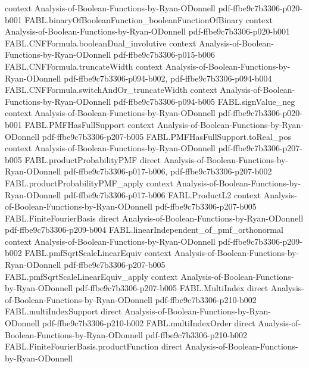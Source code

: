 \begin{theorem}
  {context}
  {Analysis-of-Boolean-Functions-by-Ryan-ODonnell}
  {pdf-ffbe9c7b3306-p020-b001}
\proofstep
  {FABL.binaryOfBooleanFunction_booleanFunctionOfBinary}
  {context}
  {Analysis-of-Boolean-Functions-by-Ryan-ODonnell}
  {pdf-ffbe9c7b3306-p020-b001}
\proofstep
  {FABL.CNFFormula.booleanDual_involutive}
  {context}
  {Analysis-of-Boolean-Functions-by-Ryan-ODonnell}
  {pdf-ffbe9c7b3306-p015-b006}
\proofstep
  {FABL.CNFFormula.truncateWidth}
  {context}
  {Analysis-of-Boolean-Functions-by-Ryan-ODonnell}
  {pdf-ffbe9c7b3306-p094-b002,
    pdf-ffbe9c7b3306-p094-b004}
\proofstep
  {FABL.CNFFormula.switchAndOr_truncateWidth}
  {context}
  {Analysis-of-Boolean-Functions-by-Ryan-ODonnell}
  {pdf-ffbe9c7b3306-p094-b005}
\proofstep
  {FABL.signValue_neg}
  {context}
  {Analysis-of-Boolean-Functions-by-Ryan-ODonnell}
  {pdf-ffbe9c7b3306-p020-b001}
\proofstep
  {FABL.PMFHasFullSupport}
  {context}
  {Analysis-of-Boolean-Functions-by-Ryan-ODonnell}
  {pdf-ffbe9c7b3306-p207-b005}
\proofstep
  {FABL.PMFHasFullSupport.toReal_pos}
  {context}
  {Analysis-of-Boolean-Functions-by-Ryan-ODonnell}
  {pdf-ffbe9c7b3306-p207-b005}
\proofstep
  {FABL.productProbabilityPMF}
  {direct}
  {Analysis-of-Boolean-Functions-by-Ryan-ODonnell}
  {pdf-ffbe9c7b3306-p017-b006,
    pdf-ffbe9c7b3306-p207-b002}
\proofstep
  {FABL.productProbabilityPMF_apply}
  {context}
  {Analysis-of-Boolean-Functions-by-Ryan-ODonnell}
  {pdf-ffbe9c7b3306-p017-b006}
\proofstep
  {FABL.ProductL2}
  {context}
  {Analysis-of-Boolean-Functions-by-Ryan-ODonnell}
  {pdf-ffbe9c7b3306-p207-b005}
\proofstep
  {FABL.FiniteFourierBasis}
  {direct}
  {Analysis-of-Boolean-Functions-by-Ryan-ODonnell}
  {pdf-ffbe9c7b3306-p209-b004}
\proofstep
  {FABL.linearIndependent_of_pmf_orthonormal}
  {context}
  {Analysis-of-Boolean-Functions-by-Ryan-ODonnell}
  {pdf-ffbe9c7b3306-p209-b002}
\proofstep
  {FABL.pmfSqrtScaleLinearEquiv}
  {context}
  {Analysis-of-Boolean-Functions-by-Ryan-ODonnell}
  {pdf-ffbe9c7b3306-p207-b005}
\proofstep
  {FABL.pmfSqrtScaleLinearEquiv_apply}
  {context}
  {Analysis-of-Boolean-Functions-by-Ryan-ODonnell}
  {pdf-ffbe9c7b3306-p207-b005}
\proofstep
  {FABL.MultiIndex}
  {direct}
  {Analysis-of-Boolean-Functions-by-Ryan-ODonnell}
  {pdf-ffbe9c7b3306-p210-b002}
\proofstep
  {FABL.multiIndexSupport}
  {direct}
  {Analysis-of-Boolean-Functions-by-Ryan-ODonnell}
  {pdf-ffbe9c7b3306-p210-b002}
\proofstep
  {FABL.multiIndexOrder}
  {direct}
  {Analysis-of-Boolean-Functions-by-Ryan-ODonnell}
  {pdf-ffbe9c7b3306-p210-b002}
\proofstep
  {FABL.FiniteFourierBasis.productFunction}
  {direct}
  {Analysis-of-Boolean-Functions-by-Ryan-ODonnell}

\end{theorem}
